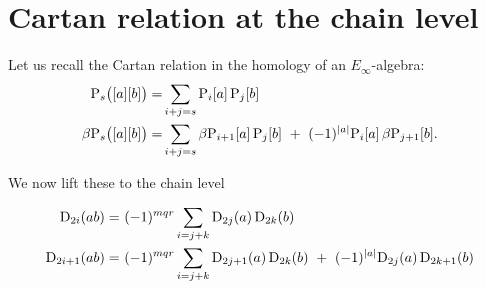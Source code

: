 
\section{Cartan relation at the chain level}\label{s:cartan}

\sssec

Let us recall the Cartan relation in the homology of an $E_\infty$-algebra:
\begin{align}
	\mathrm{P}_s\big([a][b]\big) =&
	\sum_{i+j=s} \mathrm{P}_i[a] \, \mathrm{P}_j[b] \\
	\beta\mathrm{P}_s\big([a][b]\big) =&
	\sum_{i+j=s} \beta\mathrm{P}_{i+1}[a] \, \mathrm{P}_j[b] \ +\ (-1)^{\lvert a\rvert} \mathrm{P}_i[a] \, \beta\mathrm{P}_{j+1}[b].
\end{align}

\sssec

We now lift these to the chain level

\begin{align}
	\rD_{2i}(ab) =\ &
	(-1)^{mqr} \sum_{i=j+k} \rD_{2j}(a) \, \rD_{2k}(b) \\
	\rD_{2i+1}(ab) =\ &
	(-1)^{mqr} \sum_{i=j+k} \rD_{2j+1}(a) \, \rD_{2k}(b) \ +\ (-1)^{\bars{a}}\rD_{2j}(a) \, \rD_{2k+1}(b)
\end{align}